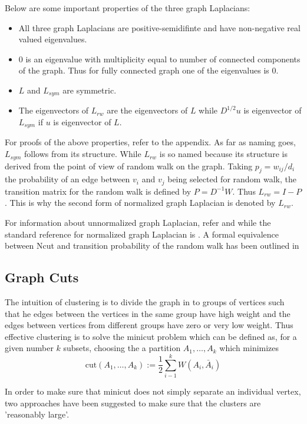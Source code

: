 \documentclass[10pt,a4paper, nocenter]{report}
\begin{document}
		Below are some important properties of the three graph Laplacians:
		\begin{itemize}
			\item All three graph Laplacians are positive-semidifinte and have non-negative real valued eigenvalues.
			\item 0 is an eigenvalue with multiplicity equal to number of connected components of the graph. Thus for fully connected graph one of the eigenvalues is 0. \item $L$ and $L_{sym}$ are symmetric. 
			\item The eigenvectors of $L_{rw}$ are the eigenvectors of $L$ while $D^{1/2}u$ is eigenvector of $L_{sym}$ if $u$ is eigenvector of $L$. 
        
    	\end{itemize}
    For proofs of the above properties, refer to the appendix. As far as naming goes, $L_{sym}$ follows from its structure. While $L_{rw}$ is so named because its structure is derived from the point of view of random walk on the graph. Taking $p_j = w_{ij}/d_i$ the probability of an edge between $v_i$ and $v_j$ being selected for random walk, the transition matrix for the random walk is defined by $P = D^{-1}W$. Thus $L_{rw} = I-P$. This is why the second form of normalized graph Laplacian is denoted by $L_{rw}$.
    
    For information about unnormalized graph Laplacian, refer \cite{mohar-1991} and \cite{mohar-1997} while the standard reference for normalized graph Laplacian is \cite{graph-spectral-book}. A formal equivalence between Ncut and transition probability of the random walk has been outlined in \cite{Meila01arandom}

    \subsection{Graph Cuts}
        The intuition of clustering is to divide the graph in to groups of vertices such that he edges between the vertices in the same group have high weight and the edges between vertices from different groups have zero or very low weight. Thus effective clustering is to solve the minicut problem which can be defined as, for a given number $k$ subsets, choosing the a partition $A_{1}, \dots, A_{k}$ which minimizes $$ \text{cut}(A_{1}, \dots, A_{k}) := \frac{1}{2}\sum_{i-1}^{k}W(A_i,\bar{A}_{i}) $$

        In order to make sure that minicut does not simply separate an individual vertex, two approaches have been suggested to make sure that the clusters are 'reasonably large'. 
\end{document}
